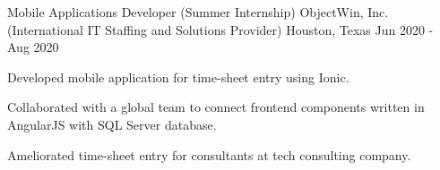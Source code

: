 
\begin{cventries}

  \cventry
	{Mobile Applications Developer \color{lightgray} (Summer Internship)} %
	{ObjectWin, Inc. \color{gray} (International IT Staffing and Solutions Provider)} %
    {Houston, Texas} %
    {Jun 2020 - Aug 2020} %
    {
      \begin{cvitems} %
	\item {Developed mobile application for time-sheet entry using Ionic.}
	\item {Collaborated with a global team to connect frontend components
		written in AngularJS with SQL Server database.}
	\item {Ameliorated time-sheet entry for consultants at tech consulting
		company.}
      \end{cvitems}
    }
    
\end{cventries}

